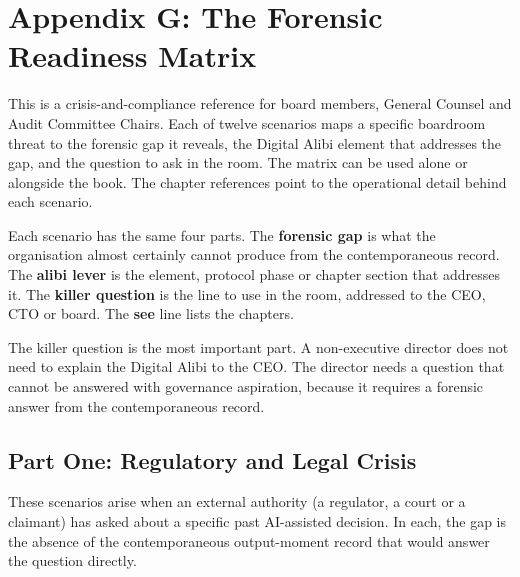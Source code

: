 
\chapter*{Appendix G: The Forensic Readiness Matrix}

This is a crisis-and-compliance reference for board members, General Counsel and Audit Committee Chairs. Each of twelve scenarios maps a specific boardroom threat to the forensic gap it reveals, the Digital Alibi element that addresses the gap, and the question to ask in the room. The matrix can be used alone or alongside the book. The chapter references point to the operational detail behind each scenario.

Each scenario has the same four parts. The \textbf{forensic gap} is what the organisation almost certainly cannot produce from the contemporaneous record. The \textbf{alibi lever} is the element, protocol phase or chapter section that addresses it. The \textbf{killer question} is the line to use in the room, addressed to the CEO, CTO or board. The \textbf{see} line lists the chapters.

The killer question is the most important part. A non-executive director does not need to explain the Digital Alibi to the CEO. The director needs a question that cannot be answered with governance aspiration, because it requires a forensic answer from the contemporaneous record.

\newcommand{\scenario}[6]{%
  \needspace{12\baselineskip}%
  \par\medskip\noindent{\color{crimson}\textbf{#1}}\quad\emph{#2}\par\smallskip
  \noindent\textbf{Forensic gap.} #3\par\smallskip
  \noindent\textbf{Alibi lever.} #4\par\smallskip
  \noindent\textbf{Killer question.} \emph{#5}\par\smallskip
  \noindent\textbf{See.} #6\par\medskip
}

\section{Part One: Regulatory and Legal Crisis}

These scenarios arise when an external authority (a regulator, a court or a claimant) has asked about a specific past AI-assisted decision. In each, the gap is the absence of the contemporaneous output-moment record that would answer the question directly.

